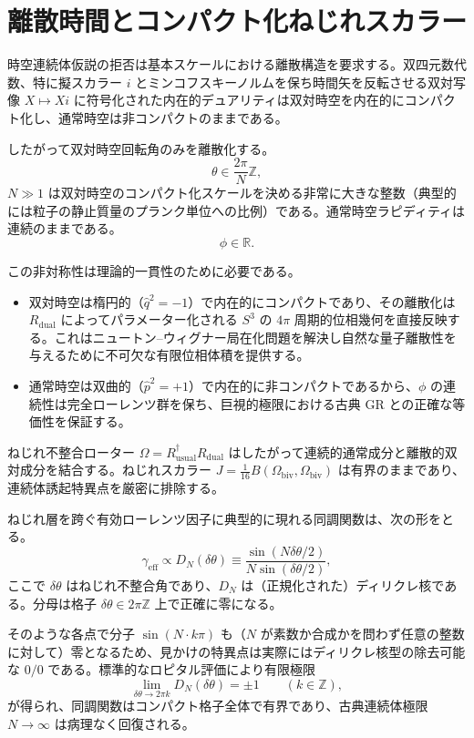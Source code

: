 \documentclass[a4paper]{article}
\begin{document}
\section{離散時間とコンパクト化ねじれスカラー}
\label{sec:discretetime}

時空連続体仮説の拒否は基本スケールにおける離散構造を要求する。双四元数代数、特に擬スカラー $i$ とミンコフスキーノルムを保ち時間矢を反転させる双対写像 $X \mapsto Xi$ に符号化された内在的デュアリティは双対時空を内在的にコンパクト化し、通常時空は非コンパクトのままである。

したがって双対時空回転角のみを離散化する。
\[
\theta \in \frac{2\pi}{N} \mathbb{Z},
\]
$N \gg 1$ は双対時空のコンパクト化スケールを決める非常に大きな整数（典型的には粒子の静止質量のプランク単位への比例）である。通常時空ラピディティは連続のままである。
\[
\phi \in \mathbb{R}.
\]

この非対称性は理論的一貫性のために必要である。
\begin{itemize}
  \item 双対時空は楕円的（$\hat{q}^2 = -1$）で内在的にコンパクトであり、その離散化は $R_{\text{dual}}$ によってパラメーター化される $S^3$ の $4\pi$ 周期的位相幾何を直接反映する。これはニュートン--ウィグナー局在化問題を解決し自然な量子離散性を与えるために不可欠な有限位相体積を提供する。
  \item 通常時空は双曲的（$\hat{p}^2 = +1$）で内在的に非コンパクトであるから、$\phi$ の連続性は完全ローレンツ群を保ち、巨視的極限における古典 GR との正確な等価性を保証する。
\end{itemize}

ねじれ不整合ローター $\Omega = R_{\text{usual}}^\dagger R_{\text{dual}}$ はしたがって連続的通常成分と離散的双対成分を結合する。ねじれスカラー $J = \frac{1}{16} B(\Omega_{\text{biv}}, \Omega_{\text{biv}})$ は有界のままであり、連続体誘起特異点を厳密に排除する。

ねじれ層を跨ぐ有効ローレンツ因子に典型的に現れる同調関数は、次の形をとる。
\[
\gamma_{\text{eff}} \propto D_N(\delta\theta) \equiv \frac{\sin(N \delta\theta / 2)}{N \sin(\delta\theta / 2)},
\]
ここで $\delta\theta$ はねじれ不整合角であり、$D_N$ は（正規化された）ディリクレ核である。分母は格子 $\delta\theta \in 2\pi \mathbb{Z}$ 上で正確に零になる。

そのような各点で分子 $\sin(N \cdot k\pi)$ も（$N$ が素数か合成かを問わず任意の整数に対して）零となるため、見かけの特異点は実際にはディリクレ核型の除去可能な $0/0$ である。標準的なロピタル評価により有限極限
\[
\lim_{\delta\theta \to 2\pi k} D_N(\delta\theta) = \pm 1 \qquad (k \in \mathbb{Z}),
\]
が得られ、同調関数はコンパクト格子全体で有界であり、古典連続体極限 $N \to \infty$ は病理なく回復される。
\end{document}
